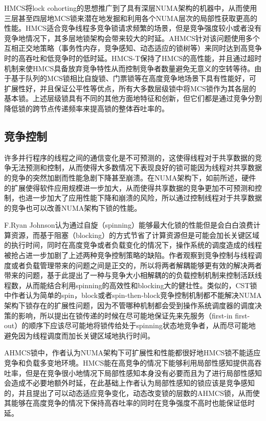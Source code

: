 HMCS将lock cohorting的思想推广到了具有深层NUMA架构的机器中，从而使用三层甚至四层地MCS锁来潜在地发掘和利用各个NUMA层次的局部性获取更高的性能。HMCS适合竞争线程多竞争锁请求频繁的场景，但是竞争强度较小或者没有竞争地情况下，其多层地锁架构会带来较大的时延。AHMCS针对该问题使用多个互相正交地策略（事务性内存，竞争感知、动态适应的锁树等）来同时达到高竞争时的高吞吐和低竞争时的低时延。HMCS-T保持了HMCS的高性能，并且通过超时机制来使HMCS具备放弃竞争特性从而控制竞争者数量避免无意义的空转等待。由于基于队列的MCS锁相比自旋锁、门票锁等在高度竞争地场景下具有性能好，可扩展性好，并且保证公平性等优点，所有大多数层级锁中将MCS锁作为其各层的基本锁。上述层级锁具有不同的其他方面地特征和创新，但它们都是通过竞争分割降低锁的跨节点传递频率来提高锁的整体吞吐率的。

\subsection{竞争控制}
许多并行程序的线程之间的通信变化是不可预测的，这使得线程对于共享数据的竞争无法预测和控制，从而使得大多数情况下表现良好的锁可能因为线程对共享数据的竞争的突然加剧而性能急剧下降甚至崩溃\cite{johnson2010decoupling}\cite{boyd2012non}。在NUMA架构下，如前所述，硬件的扩展使得软件应用规模进一步加大，从而使得共享数据的竞争更加不可预测和控制，也进一步加大了应用性能下降和崩溃的风险，所以通过控制线程对于共享数据的竞争也可以改善NUMA架构下锁的性能。

F.Ryan Johnson\cite{johnson2010decoupling}认为通过自旋（spinning）能够最大化锁的性能但是会白白浪费计算资源，而基于阻塞（blocking）的方式节省了计算资源但是可能会加长关键区域的执行时间，同时在高度竞争或者负载变化的情况下，操作系统的调度造成的线程被抢占进一步加剧了上述两种竞争控制策略的缺陷。作者观察到竞争控制与线程调度或者负载管理带来的问题之间是正交的，所以将两者解耦能够更有效的解决两者带来的问题，基于此提出了一种与竞争大小相解耦的的负载控制机制来控制活跃线程数，从而能结合利用spinning的高效性和blocking大的健壮性。类似的，CST锁\cite{kashyap2017scalable}中作者认为简单的spin，block或者spin-then-block竞争控制机制都不能解决NUMA架构下锁存在的扩展性问题，因为不管哪种机制都会受到操作系统调度器的调度决策的影响，所以提出在锁传递的时候在尽可能地保证先来先服务（first-in first-out）的顺序下应该尽可能地将锁传给处于spinning状态地竞争者，从而尽可能地避免因为线程调度而加长关键区域地执行时间。

AHMCS\cite{chabbi2016contention}锁中，作者认为NUMA架构下可扩展性和性能都很好地HMCS\cite{chabbi2015high}锁不能适应竞争和负载多变地环境。HMCS能在高竞争的情况下能够利用局部性感知提供高吞吐率，但是在竞争很小地情况下局部性感知本身没有必要而且为了进行局部性感知会造成不必要地额外时延，在此基础上作者认为局部性感知的锁应该是竞争感知的，并且提出了可以动态适应竞争变化，动态改变锁的层数的AHMCS锁，从而使其能够在高度竞争的情况下保持高吞吐率的同时在竞争强度不高时也能保证低时延。

